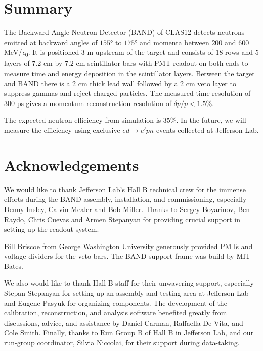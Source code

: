 \documentclass[3p,final,twocolumn]{elsarticle}
\begin{document}
\section{Summary}
The Backward Angle Neutron Detector (BAND) of CLAS12 detects neutrons
  emitted at backward angles of $155$\si{\degree} to $175$\si{\degree}
  and momenta between $200$ and $600$ \si{\MeV/\clight}. It is
  positioned 3 \si{\meter} upstream of the target and consists of $18$
  rows and $5$ layers of $7.2$ \si{\centi\meter} by $7.2$
  \si{\centi\meter} scintillator bars with PMT readout on both ends to
  measure time and energy deposition in the scintillator
  layers. Between the target and BAND there is a 2 \si{\centi\meter}
  thick lead wall followed by a 2 \si{\centi\meter} veto layer to
  suppress gammas and reject charged particles. The measured time
  resolution of 300 ps gives a momentum
  reconstruction resolution of $\delta p/p < 1.5$\%.
 

The expected neutron efficiency from simulation is $35$\%. In the
future, we will measure the efficiency using exclusive $ed \rightarrow e'pn$
events collected at Jefferson Lab.


\section*{Acknowledgements}
We would like to thank Jefferson Lab's Hall B technical crew for the immense efforts during the BAND assembly, installation, and commissioning, especially Denny Insley, Calvin Mealer and Bob Miller. Thanks to Sergey Boyarinov, Ben Raydo, Chris Cuevas and Armen Stepanyan for providing crucial support in setting up the readout system.

Bill Briscoe from George Washington University generously provided PMTs and voltage dividers for the veto bars. The BAND support frame was build by MIT Bates. 

We also would like to thank Hall B staff for their unwavering support, especially Stepan Stepanyan for setting up an assembly and testing area at Jefferson Lab and Eugene Pasyuk for organizing components. The development of the calibration, reconstruction, and analysis software benefited greatly from discussions, advice, and assistance by Daniel Carman, Raffaella De Vita, and Cole Smith. Finally, thanks to Run Group B of Hall B in Jefferson Lab, and our run-group coordinator, Silvia Niccolai, for their support during data-taking.
\end{document}
